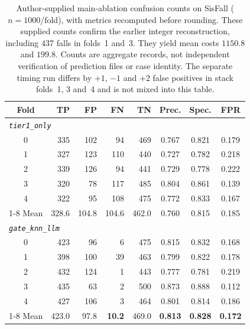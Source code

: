 \begin{table}[!t]
\centering
\caption{Author-supplied main-ablation confusion counts on SisFall ($n{=}1000$/fold), with metrics recomputed before rounding. These supplied counts confirm the earlier integer reconstruction, including $437$ falls in folds~1 and~3. They yield mean costs $1150.8$ and $199.8$. Counts are aggregate records, not independent verification of prediction files or case identity. The separate timing run differs by $+1$, $-1$ and $+2$ false positives in stack folds~1, 3 and~4 and is not mixed into this table.}
\label{tab:confusion}
\begin{tabular}{c rrrr ccc}
\toprule
Fold & TP & FP & FN & TN & Prec. & Spec. & FPR \\
\midrule
\multicolumn{8}{l}{\textit{\texttt{tier1\_only}}} \\
0 & 335 & 102 & 94  & 469 & 0.767 & 0.821 & 0.179 \\
1 & 327 & 123 & 110 & 440 & 0.727 & 0.782 & 0.218 \\
2 & 339 & 126 & 94  & 441 & 0.729 & 0.778 & 0.222 \\
3 & 320 & 78  & 117 & 485 & 0.804 & 0.861 & 0.139 \\
4 & 322 & 95  & 108 & 475 & 0.772 & 0.833 & 0.167 \\
\cmidrule(lr){1-8}
Mean & 328.6 & 104.8 & 104.6 & 462.0 & 0.760 & 0.815 & 0.185 \\
\midrule
\multicolumn{8}{l}{\textit{\texttt{gate\_knn\_llm}}} \\
0 & 423 & 96  & 6  & 475 & 0.815 & 0.832 & 0.168 \\
1 & 398 & 100 & 39 & 463 & 0.799 & 0.822 & 0.178 \\
2 & 432 & 124 & 1  & 443 & 0.777 & 0.781 & 0.219 \\
3 & 435 & 63  & 2  & 500 & 0.873 & 0.888 & 0.112 \\
4 & 427 & 106 & 3  & 464 & 0.801 & 0.814 & 0.186 \\
\cmidrule(lr){1-8}
Mean & 423.0 & 97.8 & \textbf{10.2} & 469.0 & \textbf{0.813} & \textbf{0.828} & \textbf{0.172} \\
\bottomrule
\end{tabular}
\end{table}
